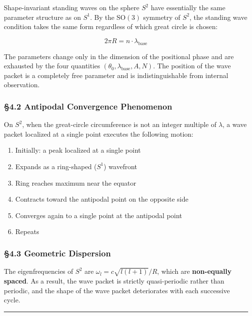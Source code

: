 \documentclass[
  a4paper,11pt]{article}
\providecommand{\tightlist}{%
  \setlength{\itemsep}{0pt}\setlength{\parskip}{0pt}}
\theoremstyle{definition}
\theoremstyle{remark}
\begin{document}
Shape-invariant standing waves on the sphere \(S^2\) have essentially
the same parameter structure as on \(S^1\). By the \(\mathrm{SO}(3)\)
symmetry of \(S^2\), the standing wave condition takes the same form
regardless of which great circle is chosen:

\[2\pi R = n \cdot \lambda_{\text{base}}\]

The parameters change only in the dimension of the positional phase and
are exhausted by the four quantities
\((\theta_0, \lambda_{\text{base}}, A, N)\). The position of the wave
packet is a completely free parameter and is indistinguishable from
internal observation.

\subsubsection{§4.2 Antipodal Convergence
Phenomenon}\label{antipodal-convergence-phenomenon}

On \(S^2\), when the great-circle circumference is not an integer
multiple of \(\lambda\), a wave packet localized at a single point
executes the following motion:

\begin{enumerate}
\def\labelenumi{\arabic{enumi}.}
\tightlist
\item
  Initially: a peak localized at a single point
\item
  Expands as a ring-shaped (\(S^1\)) wavefront
\item
  Ring reaches maximum near the equator
\item
  Contracts toward the antipodal point on the opposite side
\item
  Converges again to a single point at the antipodal point
\item
  Repeats
\end{enumerate}

\subsubsection{§4.3 Geometric Dispersion}\label{geometric-dispersion}

The eigenfrequencies of \(S^2\) are \(\omega_l = c\sqrt{l(l+1)}/R\),
which are \textbf{non-equally spaced}. As a result, the wave packet is
strictly quasi-periodic rather than periodic, and the shape of the wave
packet deteriorates with each successive cycle.

\begin{center}\rule{0.5\linewidth}{0.5pt}\end{center}
\end{document}
